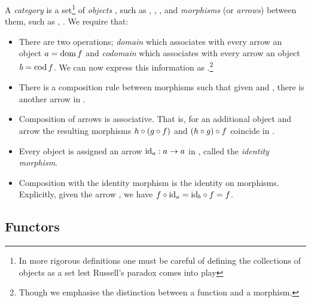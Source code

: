 \begin{categorydef}
  A \emph{category}  is a set\footnote{In more rigorous definitions one must be careful of defining the collections of objects as a set lest Russell's paradox comes into play} of \emph{objects} , such as , , , and \emph{morphisms} (or \emph{arrows})  between them, such as , . We require that:
  \begin{itemize}
    \item There are two operations; \emph{domain} which associates with every arrow  an object $\mathnormal{a} = \mathrm{dom}\,\mathnormal{f}$ and \emph{codomain} which associates with every arrow  an object $\mathnormal{b} = \mathrm{cod}\,\mathnormal{f}$. We can now express this information as .\footnote{Though we emphasise the distinction between a function and a morphism.}
    \item There is a composition rule between morphisms such that given  and , there is another arrow  in .
    \item Composition of arrows is associative. That is, for an additional object  and arrow  the resulting morphisms $\mathnormal{h} \circ \left(\mathnormal{g} \circ \mathnormal{f}\right)$ and $\left(\mathnormal{h} \circ \mathnormal{g}\right) \circ \mathnormal{f}$ coincide in .
    \item Every object  is assigned an arrow $\mathrm{id}_{\mathnormal{a}}: \mathnormal{a} \to \mathnormal{a}$ in , called the \emph{identity morphism}.
    \item Composition with the identity morphism is the identity on morphisms. Explicitly, given the arrow , we have $\mathnormal{f} \circ \mathrm{id}_{\mathnormal{a}} = \mathrm{id}_{\mathnormal{b}} \circ \mathnormal{f} = \mathnormal{f}$.
  \end{itemize}
\end{categorydef}

\subsection{Functors}
\theoremstyle{definition}\newtheorem*{covfunctordef}{Functor}

